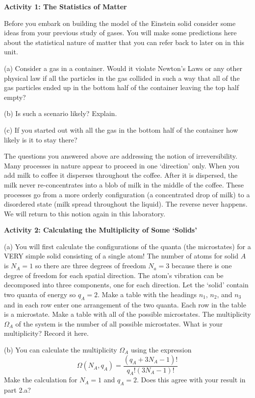 \textbf{Activity 1: The Statistics of Matter}

Before you embark on building the model of the Einstein solid consider some ideas from
your previous study of gases. 
You will make some predictions here about the statistical nature of matter that you can
refer back to later on in this unit.

(a) Consider a gas in a container. Would it violate Newton's Laws or any other physical law
if all the particles in the gas collided in such a way that all of the gas particles
ended up in the bottom half of the container leaving the top half empty?
\vspace{15mm}

(b) Is such a scenario likely? Explain.
\vspace{15mm}

(c) If you started out with all the gas in the bottom half of the container how likely is
it to stay there?
\vspace{15mm}

The questions you answered above are addressing the notion of irreversibility.
Many processes in nature appear to proceed in one `direction' only.
When you add milk to coffee it disperses throughout the coffee.
After it is dispersed, the milk never re-concentrates into a blob of milk in the
middle of the coffee.
These processes go from a more orderly configuration (a concentrated drop of milk)
to a disordered state (milk spread throughout the liquid).
The reverse never happens.
We will return to this notion again in this laboratory.

\textbf{Activity 2: Calculating the Multiplicity of Some `Solids'}

(a) You will first calculate the configurations of 
the quanta (the microstates) for a VERY simple solid consisting of a single
atom!
The number of atoms for solid $A$ is $N_A=1$ so there are three degrees of
freedom $N_a=3$ because there is one degree of freedom for each
spatial direction.
The atom's vibration can be decomposed into three components, one for each direction.
Let the `solid' contain two quanta of energy so $q_A=2$.
Make a table with the headings $n_1$, $n_2$, and $n_3$ 
and in each row enter one
arrangement of the two quanta.
Each row in the table is a microstate.
Make a table with all of the possible microstates.
The multiplicity $\Omega_A$ of the system is the number of all possible
microstates. What is your multiplicity?
Record it here.
\answerspace{45mm}

(b) You can calculate the multiplicity $\Omega_A$ using the expression
\begin{equation}
\Omega(N_A,q_A) = \frac{(q_A + 3N_A -1)!}{q_A! (3N_A-1)!}
\end{equation}
Make the calculation for $N_A = 1$ and $q_A = 2$.
Does this agree with your result in part 2.a?
\answerspace{15mm}

